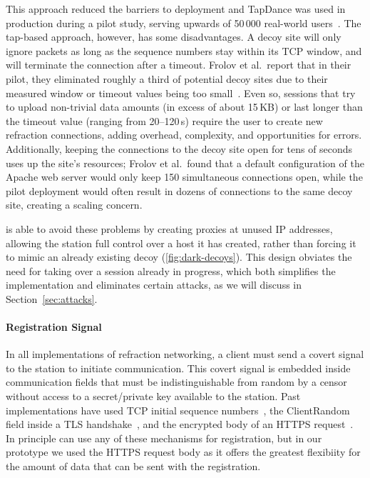 This approach reduced the barriers to deployment and TapDance was used in production during a pilot study, serving upwards of 50\,000 real-world users~\cite{frolov2017isp}. 
The tap-based approach, however, has some disadvantages. A decoy site will only ignore packets as long as the sequence numbers stay within its TCP window, and will terminate the connection after a timeout. Frolov et al.\ report that in their pilot, they eliminated roughly a third of potential decoy sites due to their measured window or timeout values being too small~\cite{frolov2017isp}. Even so, sessions that try to upload non-trivial data amounts (in excess of about 15\,KB) or last longer than the timeout value (ranging from 20--120\,s) require the user to create new refraction connections, adding overhead, complexity, and opportunities for errors. Additionally, keeping the connections to the decoy site open for tens of seconds uses up the site's resources; Frolov et al.\ found that a default configuration of the Apache web server would only keep 150 simultaneous connections open, while the pilot deployment would often result in dozens of connections to the same decoy site, creating a scaling concern.

\scheme is able to avoid these problems by creating proxies at unused IP addresses, allowing the station full control over a host it has created, rather than forcing it to mimic an already existing decoy (\cref{fig:dark-decoys}).
This design obviates the need for taking over a session already in progress, which both simplifies the implementation and eliminates certain attacks, as we will discuss in Section~\ref{sec:attacks}.

\paragraph{Registration Signal} In all implementations of refraction networking, a client must send a covert signal to the station to initiate communication. This covert signal is  embedded inside communication fields that must be indistinguishable from random by a censor without access to a secret/private key available to the station. Past implementations have used TCP initial sequence numbers~\cite{cirripede11}, the ClientRandom field inside a TLS handshake~\cite{curveball11,telex11}, and the encrypted body of an HTTPS request~\cite{tapdance14}. In principle \scheme can use any of these mechanisms for registration, but in our prototype we used the HTTPS request body as it offers the greatest flexibiity for the amount of data that can be sent with the registration.
